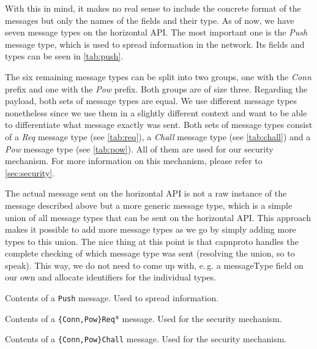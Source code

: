 \documentclass[a4paper,english,10pt,NET]{tumarticle}
\renewcommand{\eg}{\mbox{e.\,g.}\xspace} %
\begin{document}
With this in mind, it makes no real sense to include the concrete format of the messages but only the names of the fields and their type.
As of now, we have seven message types on the horizontal API.
The most important one is the \emph{Push} message type, which is used to spread information in the network.
Its fields and types can be seen in \cref{tab:push}.

The six remaining message types can be split into two groups, one with the \emph{Conn} prefix and one with the \emph{Pow} prefix.
Both groups are of size three.
Regarding the payload, both sets of message types are equal.
We use different message types nonetheless since we use them in a slightly different context and want to be able to differentiate what message exactly was sent.
Both sets of message types consist of
a \emph{Req} message type (see \cref{tab:req}),
a \emph{Chall} message type (see \cref{tab:chall}) and
a \emph{Pow} message type (see \cref{tab:pow}).
All of them are used for our security mechanism.
For more information on this mechanism, please refer to \cref{sec:security}.

The actual message sent on the horizontal API is not a raw instance of the message described above but a more generic message type, which is a simple union of all message types that can be sent on the horizontal API.
This approach makes it possible to add more message types as we go by simply adding more types to this union.
The nice thing at this point is that capnproto handles the complete checking of which message type was sent (resolving the union, so to speak).
This way, we do not need to come up with, \eg a messageType field on our own and allocate identifiers for the individual types.

\begin{table}
	\centering
	
	\caption{
		Contents of a \texttt{Push} message.
		Used to spread information.
	}
	\label{tab:push}
\end{table}

\begin{table}
	\centering
	
	\caption{
		Contents of a \texttt{\{Conn,Pow\}Req}* message.
		Used for the security mechanism.
	}
	\label{tab:req}
\end{table}

\begin{table}
	\centering
	
	\caption{
		Contents of a \texttt{\{Conn,Pow\}Chall} message.
		Used for the security mechanism.
	}
	\label{tab:chall}
\end{table}
\end{document}
